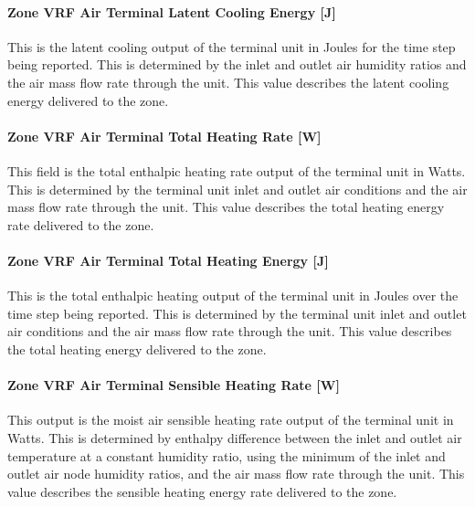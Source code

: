 \paragraph{Zone VRF Air Terminal Latent Cooling Energy {[}J{]}}\label{zone-vrf-air-terminal-latent-cooling-energy-j}

This is the latent cooling output of the terminal unit in Joules for the time step being reported. This is determined by the inlet and outlet air humidity ratios and the air mass flow rate through the unit. This value describes the latent cooling energy delivered to the zone.

\paragraph{Zone VRF Air Terminal Total Heating Rate {[}W{]}}\label{zone-vrf-air-terminal-total-heating-rate-w}

This field is the total enthalpic heating rate output of the terminal unit in Watts. This is determined by the terminal unit inlet and outlet air conditions and the air mass flow rate through the unit. This value describes the total heating energy rate delivered to the zone.

\paragraph{Zone VRF Air Terminal Total Heating Energy {[}J{]}}\label{zone-vrf-air-terminal-total-heating-energy-j}

This is the total enthalpic heating output of the terminal unit in Joules over the time step being reported. This is determined by the terminal unit inlet and outlet air conditions and the air mass flow rate through the unit. This value describes the total heating energy delivered to the zone.

\paragraph{Zone VRF Air Terminal Sensible Heating Rate {[}W{]}}\label{zone-vrf-air-terminal-sensible-heating-rate-w}

This output is the moist air sensible heating rate output of the terminal unit in Watts. This is determined by enthalpy difference between the inlet and outlet air temperature at a constant humidity ratio, using the minimum of the inlet and outlet air node humidity ratios, and the air mass flow rate through the unit. This value describes the sensible heating energy rate delivered to the zone.

